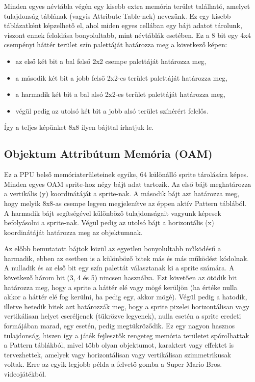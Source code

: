 	Minden egyes névtábla végén egy kisebb extra memória terület található, amelyet tulajdonság táblának (vagyis Attribute Table-nek) nevezünk. Ez egy kisebb táblázatként képzelhető el, ahol miden egyes cellában egy bájt adatot tárolunk, viszont ennek feloldása bonyolultabb, mint névtáblák esetében. Ez a 8 bit egy 4x4 csempényi háttér terület szín palettáját határozza meg a következő képen:
	
	\begin{itemize}
		\item az első két bit a bal felső 2x2 csempe palettáját határozza meg, 
		\item a második két bit a jobb felső 2x2-es terület palettáját határozza meg, 
		\item a harmadik két bit a bal alsó 2x2-es terület palettáját határozza meg,
		\item végül pedig az utolsó két bit a jobb alsó terület színérért felelős.
	\end{itemize}
	
	 Így a teljes képünket 8x8 ilyen bájttal írhatjuk le. 
 
 	 \subsection{Objektum Attribútum Memória (OAM)}
 	 \label{sec:OAM-memory}
 	 Ez a PPU belső memóriaterületeinek egyike, 64 különálló sprite tárolására képes. Minden egyes OAM sprite-hoz négy bájt adat tartozik. Az első bájt meghatározza a vertikális (y) koordinátáját a sprite-nak. A második bájt azt határozza meg, hogy melyik 8x8-as csempe legyen megjelenítve az éppen aktív Pattern táblából. A harmadik bájt segítségével különböző tulajdonságait vagyunk képesek befolyásolni a sprite-nak. Végül pedig az utolsó bájt a horizontális (x) koordinátáját határozza meg az objektumnak.
 	 
 	 Az előbb bemutatott bájtok közül az egyetlen bonyolultabb működésű a harmadik, ebben az esetben is a különböző bitek más és más működést kódolnak.  A nulladik és az első bit egy szín palettát választanak ki a sprite számára. A következő három bit (3, 4 és 5) nincsen használva. Ezt követően az ötödik bit határozza meg, hogy a sprite a háttér elé vagy mögé kerüljön (ha értéke nulla akkor a háttér elé fog kerülni, ha pedig egy, akkor mögé). Végül pedig a hatodik, illetve hetedik bitek azt határozzák meg, hogy a sprite pixelei horizontálisan vagy vertikálisan helyet cseréljenek (tükrözve legyenek), nulla esetén a sprite eredeti formájában marad, egy esetén, pedig megtükröződik. Ez egy nagyon hasznos tulajdonság, hiszen így a játék fejlesztők rengeteg memória területet spórolhattak a Pattern táblákból, mivel több olyan objektumot, karaktert vagy effektet is tervezhettek, amelyek vagy horizontálisan vagy vertikálisan szimmetrikusak voltak. Erre az egyik legjobb példa a felvető gomba  a Super Mario Bros. videojátékból.    
 	     

